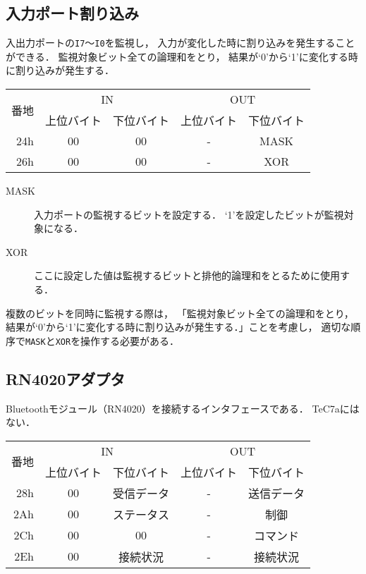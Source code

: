\subsection{入力ポート割り込み}
入出力ポートの\texttt{I7}〜\texttt{I0}を監視し，
入力が変化した時に割り込みを発生することができる．
監視対象ビット全ての論理和をとり，
結果が`0'から`1'に変化する時に割り込みが発生する．

\begin{center}
  \small\begin{tabular}{| r | c | c || c | c |}\hline
    \multirow{2}{*}{番地}
    & \multicolumn{2}{|c||}{IN}
    & \multicolumn{2}{c|}{OUT}
    \\\cline{2-5}
         & 上位バイト & 下位バイト & 上位バイト & 下位バイト
    \\\hline\hline
    24h  &  00 & 00
         &  -  & MASK \\\hline
    26h  &  00 & 00
         &  -  & XOR \\\hline
  \end{tabular}
\end{center}

\begin{description}
\item[MASK]
  入力ポートの監視するビットを設定する．
  `1'を設定したビットが監視対象になる．
\item[XOR]
  ここに設定した値は監視するビットと排他的論理和をとるために使用する．
\end{description}

複数のビットを同時に監視する際は，
「監視対象ビット全ての論理和をとり，
結果が`0'から`1'に変化する時に割り込みが発生する．」ことを考慮し，
適切な順序で\texttt{MASK}と\texttt{XOR}を操作する必要がある．

\subsection{RN4020アダプタ}
Bluetoothモジュール（RN4020）を接続するインタフェースである．
TeC7aにはない．

\begin{center}
  \small\begin{tabular}{| r | c | c || c | c |}\hline
    \multirow{2}{*}{番地}
    & \multicolumn{2}{|c||}{IN}
    & \multicolumn{2}{c|}{OUT}
    \\\cline{2-5}
         & 上位バイト & 下位バイト & 上位バイト & 下位バイト
    \\\hline\hline
    28h  &  00 & 受信データ
         &  -  & 送信データ \\\hline
    2Ah  &  00 & ステータス
         &  -  & 制御 \\\hline
    2Ch  &  00 & 00
         &  -  & コマンド \\\hline
    2Eh  &  00 & 接続状況
         &  -  & 接続状況 \\\hline
  \end{tabular}
\end{center}

